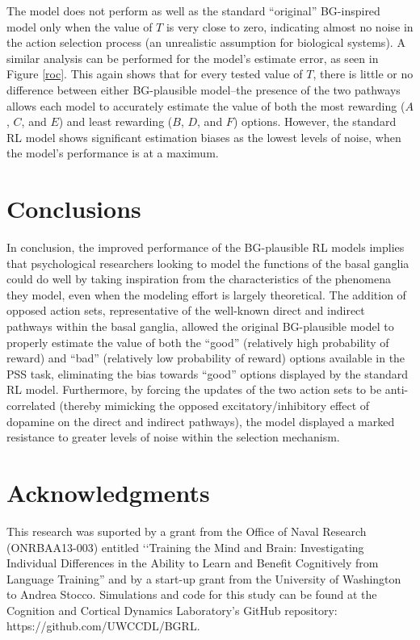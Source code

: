 \documentclass[10pt,letterpaper]{article}
\begin{document}
The model does not perform as well as the standard ``original'' BG-inspired model only when the value of $T$ is very close to zero, indicating almost no noise in the action selection process (an unrealistic assumption for biological systems). A similar analysis can be performed for the model's estimate error, as seen in Figure \ref{roc}. This again shows that for every tested value of $T$, there is little or no difference between either BG-plausible model--the presence of the two pathways allows each model to accurately estimate the value of both the most rewarding ($A$, $C$, and $E$) and least rewarding ($B$, $D$, and $F$) options. However, the standard RL model shows significant estimation biases as the lowest levels of noise, when the model's performance is at a maximum.

\section{Conclusions}

In conclusion, the improved performance of the BG-plausible RL models implies that psychological researchers looking to model the functions of the basal ganglia could do well by taking inspiration from the characteristics of the phenomena they model, even when the modeling effort is largely theoretical. The addition of opposed action sets, representative of the well-known direct and indirect pathways within the basal ganglia, allowed the original BG-plausible model to properly estimate the value of both the ``good'' (relatively high probability of reward) and ``bad'' (relatively low probability of reward) options available in the PSS task, eliminating the bias towards ``good'' options displayed by the standard RL model. Furthermore, by forcing the updates of the two action sets to be anti-correlated (thereby mimicking the opposed excitatory/inhibitory effect of dopamine on the direct and indirect pathways), the model displayed a marked resistance to greater levels of noise within the selection mechanism.    

\section{Acknowledgments}

This research was suported by a grant from the Office of Naval Research (ONRBAA13-003) entitled ‘‘Training the Mind and Brain: Investigating Individual Differences in the Ability to Learn and Benefit Cognitively from Language Training'' and by a start-up grant from the University of Washington to Andrea Stocco. Simulations and code for this study can be found at the Cognition and Cortical Dynamics Laboratory's {\color{red} GitHub} repository: https://github.com/UWCCDL/BGRL.



\setlength{\bibleftmargin}{.125in}
\setlength{\bibindent}{-\bibleftmargin}


\end{document}
